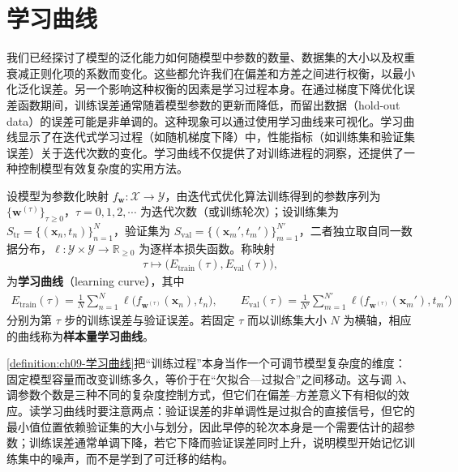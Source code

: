 \documentclass[../../main.tex]{subfiles}
\begin{document}
\section{学习曲线}\label{section:ch09-学习曲线}

我们已经探讨了模型的泛化能力如何随模型中参数的数量、数据集的大小以及权重衰减正则化项的系数而变化。这些都允许我们在偏差和方差之间进行权衡，以最小化泛化误差。另一个影响这种权衡的因素是学习过程本身。在通过梯度下降优化误差函数期间，训练误差通常随着模型参数的更新而降低，而留出数据（hold-out data）的误差可能是非单调的。这种现象可以通过使用学习曲线来可视化。学习曲线显示了在迭代式学习过程（如随机梯度下降）中，性能指标（如训练集和验证集误差）关于迭代次数的变化。学习曲线不仅提供了对训练进程的洞察，还提供了一种控制模型有效复杂度的实用方法。

\begin{definition}[学习曲线]\label{definition:ch09-学习曲线}
设模型为参数化映射 $f_{\boldsymbol{w}}:\mathcal{X}\to\mathcal{Y}$，由迭代式优化算法训练得到的参数序列为 $\{\boldsymbol{w}^{(\tau)}\}_{\tau\geqslant0}$，$\tau=0,1,2,\cdots$ 为迭代次数（或训练轮次）；设训练集为 $S_{\mathrm{tr}}=\{(\boldsymbol{x}_{n},t_{n})\}_{n=1}^{N}$，验证集为 $S_{\mathrm{val}}=\{(\boldsymbol{x}_{m}',t_{m}')\}_{m=1}^{N'}$，二者独立取自同一数据分布，$\ell:\mathcal{Y}\times\mathcal{Y}\to\mathbb{R}_{\geqslant0}$ 为逐样本损失函数。称映射
\begin{align*}
\tau\mapsto\bigl(E_{\mathrm{train}}(\tau),E_{\mathrm{val}}(\tau)\bigr),
\end{align*}
为\textbf{学习曲线}（learning curve），其中
\begin{align*}
E_{\mathrm{train}}(\tau)=\frac{1}{N}\sum_{n=1}^{N}\ell\bigl(f_{\boldsymbol{w}^{(\tau)}}(\boldsymbol{x}_{n}),t_{n}\bigr),\qquad
E_{\mathrm{val}}(\tau)=\frac{1}{N'}\sum_{m=1}^{N'}\ell\bigl(f_{\boldsymbol{w}^{(\tau)}}(\boldsymbol{x}_{m}'),t_{m}'\bigr)
\end{align*}
分别为第 $\tau$ 步的训练误差与验证误差。若固定 $\tau$ 而以训练集大小 $N$ 为横轴，相应的曲线称为\textbf{样本量学习曲线}。
\end{definition}

\begin{remark}\cref{definition:ch09-学习曲线}把“训练过程”本身当作一个可调节模型复杂度的维度：固定模型容量而改变训练多久，等价于在“欠拟合—过拟合”之间移动。这与调 $\lambda$、调参数个数是三种不同的复杂度控制方式，但它们在偏差--方差意义下有相似的效应。读学习曲线时要注意两点：验证误差的非单调性是过拟合的直接信号，但它的最小值位置依赖验证集的大小与划分，因此早停的轮次本身是一个需要估计的超参数；训练误差通常单调下降，若它下降而验证误差同时上升，说明模型开始记忆训练集中的噪声，而不是学到了可迁移的结构。
\end{remark}
\end{document}
